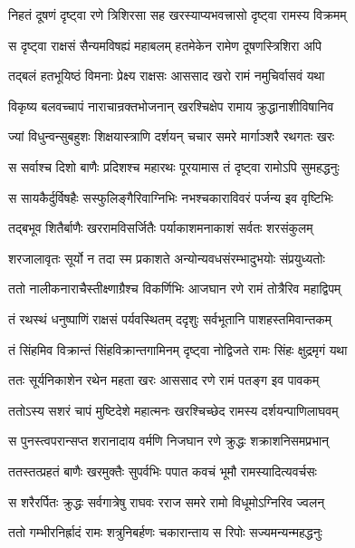 \twolineshloka
{निहतं दूषणं दृष्ट्वा रणे त्रिशिरसा सह}
{खरस्याप्यभवत्त्रासो दृष्ट्वा रामस्य विक्रमम्} %

\twolineshloka
{स दृष्ट्वा राक्षसं सैन्यमविषह्यं महाबलम्}
{हतमेकेन रामेण दूषणस्त्रिशिरा अपि} %

\twolineshloka
{तद्बलं हतभूयिष्ठं विमनाः प्रेक्ष्य राक्षसः}
{आससाद खरो रामं नमुचिर्वासवं यथा} %

\twolineshloka
{विकृष्य बलवच्चापं नाराचान्रक्तभोजनान्}
{खरश्चिक्षेप रामाय क्रुद्धानाशीविषानिव} %

\twolineshloka
{ज्यां विधुन्वन्सुबहुशः शिक्षयास्त्राणि दर्शयन्}
{चचार समरे मार्गाञ्शरै रथगतः खरः} %

\twolineshloka
{स सर्वाश्च दिशो बाणैः प्रदिशश्च महारथः}
{पूरयामास तं दृष्ट्वा रामोऽपि सुमहद्धनुः} %

\twolineshloka
{स सायकैर्दुर्विषहैः सस्फुलिङ्गैरिवाग्निभिः}
{नभश्चकाराविवरं पर्जन्य इव वृष्टिभिः} %

\twolineshloka
{तद्बभूव शितैर्बाणैः खररामविसर्जितैः}
{पर्याकाशमनाकाशं सर्वतः शरसंकुलम्} %

\twolineshloka
{शरजालावृतः सूर्यो न तदा स्म प्रकाशते}
{अन्योन्यवधसंरम्भादुभयोः संप्रयुध्यतोः} %

\twolineshloka
{ततो नालीकनाराचैस्तीक्ष्णाग्रैश्च विकर्णिभिः}
{आजघान रणे रामं तोत्रैरिव महाद्विपम्} %

\twolineshloka
{तं रथस्थं धनुष्पाणिं राक्षसं पर्यवस्थितम्}
{ददृशुः सर्वभूतानि पाशहस्तमिवान्तकम्} %

\twolineshloka
{तं सिंहमिव विक्रान्तं सिंहविक्रान्तगामिनम्}
{दृष्ट्वा नोद्विजते रामः सिंहः क्षुद्रमृगं यथा} %

\twolineshloka
{ततः सूर्यनिकाशेन रथेन महता खरः}
{आससाद रणे रामं पतङ्ग इव पावकम्} %

\twolineshloka
{ततोऽस्य सशरं चापं मुष्टिदेशे महात्मनः}
{खरश्चिच्छेद रामस्य दर्शयन्पाणिलाघवम्} %

\twolineshloka
{स पुनस्त्वपरान्सप्त शरानादाय वर्मणि}
{निजघान रणे क्रुद्धः शक्राशनिसमप्रभान्} %

\twolineshloka
{ततस्तत्प्रहतं बाणैः खरमुक्तैः सुपर्वभिः}
{पपात कवचं भूमौ रामस्यादित्यवर्चसः} %

\twolineshloka
{स शरैरर्पितः क्रुद्धः सर्वगात्रेषु राघवः}
{रराज समरे रामो विधूमोऽग्निरिव ज्वलन्} %

\twolineshloka
{ततो गम्भीरनिर्ह्रादं रामः शत्रुनिबर्हणः}
{चकारान्ताय स रिपोः सज्यमन्यन्महद्धनुः} %

